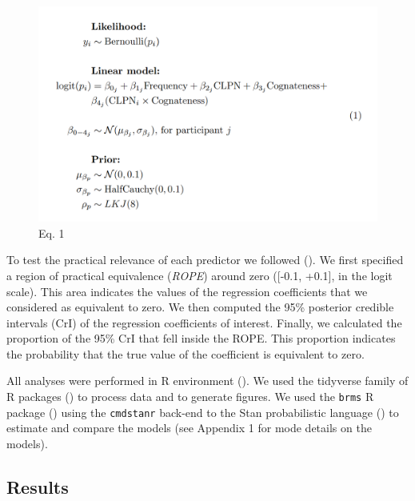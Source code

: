 \documentclass[
]{article}
\begin{document}
\begin{figure}[H]

{\centering \includegraphics{_assets/img/model.PNG}

}

\caption{Eq. 1}

\end{figure}%

To test the practical relevance of each predictor we followed
(). We
first specified a region of practical equivalence (\emph{ROPE}) around
zero ({[}-0.1, +0.1{]}, in the logit scale). This area indicates the
values of the regression coefficients that we considered as equivalent
to zero. We then computed the 95\% posterior credible intervals (CrI) of
the regression coefficients of interest. Finally, we calculated the
proportion of the 95\% CrI that fell inside the ROPE. This proportion
indicates the probability that the true value of the coefficient is
equivalent to zero.

All analyses were performed in R environment
(). We used the tidyverse family
of R packages () to process data and to generate figures. We used the
\texttt{brms} R package ()
using the \texttt{cmdstanr} back-end to the Stan probabilistic language
() to estimate
and compare the models (see Appendix 1 for mode details on the models).

\subsection{Results}\label{results}
\end{document}
